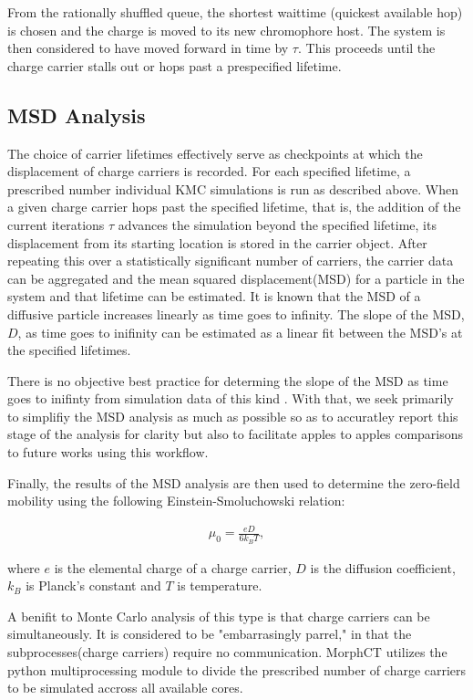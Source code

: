 From the rationally shuffled queue, the shortest waittime (quickest available hop) is chosen and the charge is moved to
its new chromophore host. The system is then considered to have moved forward in time by $\tau$. This proceeds
until the charge carrier stalls out or hops past a prespecified lifetime. 

\subsection{MSD Analysis}

The choice of carrier lifetimes effectively serve as checkpoints at which the displacement of charge carriers is recorded. For
each specified lifetime, a prescribed number individual KMC simulations is run as described above. When a
given charge carrier hops past the specified lifetime, that is, the addition of the current iterations $\tau$ advances
the simulation beyond the specified lifetime,  its displacement from its starting location is stored in the carrier object. After repeating this over a
statistically significant number of carriers, the carrier data can be aggregated and the mean squared
displacement(MSD) for a particle in the system and that lifetime can be estimated.
It is known that the MSD of a diffusive particle increases linearly as time goes to infinity. 
The slope of the MSD, $D$,  as time
goes to inifinity can be estimated as a linear fit between the MSD's at the specified lifetimes.

There is no objective best practice for determing the slope of the MSD as
time goes to inifinty from simulation data of this kind \cite{Maginn2018}. With that, we seek primarily to simplifiy the MSD analysis as much as
possible so as to accuratley report this stage of the analysis for clarity but also to facilitate apples to
apples comparisons to future works using this workflow. 

Finally, the results of the MSD analysis are then used to determine the zero-field mobility using the following Einstein-Smoluchowski relation:

\begin{align}
    \mu_{0} = \frac{eD}{6k_{B}T},
\end{align}

where $e$ is the elemental charge of a charge carrier, $D$ is the diffusion coefficient, $k_{B}$ is Planck's
constant and $T$ is temperature.  

A benifit to Monte Carlo analysis of this type is that charge carriers can be simultaneously. It is considered
to be "embarrasingly parrel," in that the subprocesses(charge carriers) require no communication.
MorphCT utilizes the python multiprocessing module to divide the prescribed number of charge carriers to be
simulated accross all available cores.  

